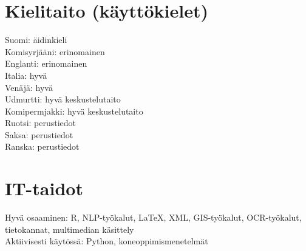\documentclass[11pt, a4paper]{article}
\newcommand{\years}[1]{\marginnote{\scriptsize #1}} %
\begin{document}



\section*{Kielitaito (käyttökielet)}

Suomi: äidinkieli\\
Komisyrjääni: erinomainen\\
Englanti: erinomainen\\
Italia: hyvä\\
Venäjä: hyvä\\
Udmurtti: hyvä keskustelutaito\\
Komipermjakki: hyvä keskustelutaito\\
Ruotsi: perustiedot\\
Saksa: perustiedot\\
Ranska: perustiedot\\

\section*{IT-taidot}

Hyvä osaaminen: R, NLP-työkalut, LaTeX, XML, GIS-työkalut, OCR-työkalut, tietokannat, multimedian käsittely\\
Aktiivisesti käytössä: Python, koneoppimismenetelmät




\end{document}
